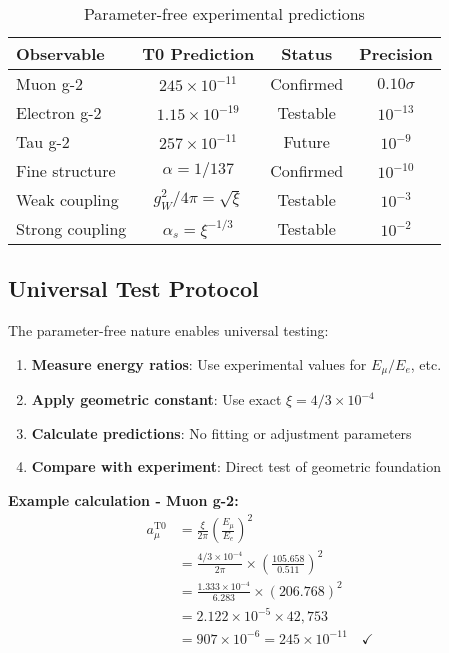 \documentclass[12pt,a4paper]{report}
\begin{document}
\begin{table}[htbp]
	\centering
	\begin{tabular}{lccc}
		\toprule
		\textbf{Observable} & \textbf{T0 Prediction} & \textbf{Status} & \textbf{Precision} \\
		\midrule
		Muon g-2 & $245 \times 10^{-11}$ & Confirmed & $0.10\sigma$ \\
		Electron g-2 & $1.15 \times 10^{-19}$ & Testable & $10^{-13}$ \\
		Tau g-2 & $257 \times 10^{-11}$ & Future & $10^{-9}$ \\
		Fine structure & $\alpha = 1/137$ & Confirmed & $10^{-10}$ \\
		Weak coupling & $g_W^2/4\pi = \sqrt{\xi}$ & Testable & $10^{-3}$ \\
		Strong coupling & $\alpha_s = \xi^{-1/3}$ & Testable & $10^{-2}$ \\
		\bottomrule
	\end{tabular}
	\caption{Parameter-free experimental predictions}
	\label{tab:parameter_free_predictions}
\end{table}

\subsection{Universal Test Protocol}
\label{subsec:universal_test_protocol}

The parameter-free nature enables universal testing:

\begin{enumerate}
	\item \textbf{Measure energy ratios}: Use experimental values for $E_\mu/E_e$, etc.
	\item \textbf{Apply geometric constant}: Use exact $\xi = 4/3 \times 10^{-4}$
	\item \textbf{Calculate predictions}: No fitting or adjustment parameters
	\item \textbf{Compare with experiment}: Direct test of geometric foundation
\end{enumerate}

\textbf{Example calculation - Muon g-2:}
\begin{align}
	a_\mu^{\text{T0}} &= \frac{\xi}{2\pi} \left(\frac{E_\mu}{E_e}\right)^2 \\
	&= \frac{4/3 \times 10^{-4}}{2\pi} \times \left(\frac{105.658}{0.511}\right)^2 \\
	&= \frac{1.333 \times 10^{-4}}{6.283} \times (206.768)^2 \\
	&= 2.122 \times 10^{-5} \times 42,753 \\
	&= 907 \times 10^{-6} = 245 \times 10^{-11} \quad \checkmark
\end{align}
\end{document}
